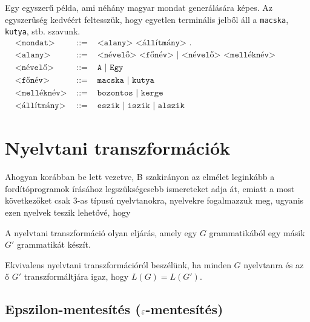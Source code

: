 Egy egyszerű példa, ami néhány magyar mondat generálására képes. Az egyszerűség kedvéért feltesszük, hogy egyetlen terminális jelből áll a \texttt{macska}, \texttt{kutya}, stb. szavunk.
\begin{align*}
	&\texttt{<mondat>} & \texttt{ ::= } &\texttt{<alany> <állítmány> .} \\
	&\texttt{<alany>} & \texttt{ ::= } &\texttt{<névelő> <főnév> | <névelő> <melléknév> <főnév>} \\
	&\texttt{<névelő>} & \texttt{ ::= } &\texttt{A | Egy} \\
	&\texttt{<főnév>} & \texttt{ ::= } &\texttt{macska | kutya} \\
	&\texttt{<melléknév>} & \texttt{ ::= } &\texttt{bozontos | kerge} \\
	&\texttt{<állítmány>} & \texttt{ ::= } &\texttt{eszik | iszik | alszik}
\end{align*}

\section{Nyelvtani transzformációk}

Ahogyan korábban be lett vezetve, B szakirányon az elmélet leginkább a fordítóprogramok írásához legszükségesebb ismereteket adja át, emiatt a most következőket csak 3-as típusú nyelvtanokra, nyelvekre fogalmazzuk meg, ugyanis ezen nyelvek teszik lehetővé, hogy 

\begin{tcolorbox}
	\begin{definition}
		A nyelvtani transzformáció olyan eljárás, amely egy $G$ grammatikából egy másik $G'$ grammatikát készít.
	\end{definition}
\end{tcolorbox}

\begin{tcolorbox}
	\begin{definition}
		Ekvivalens nyelvtani transzformációról beszélünk, ha minden $G$ nyelvtanra és az ő $G'$ transzformáltjára igaz, hogy $L(G) = L(G')$.
	\end{definition}
\end{tcolorbox}

\subsection{Epszilon-mentesítés ($\varepsilon$-mentesítés)}

